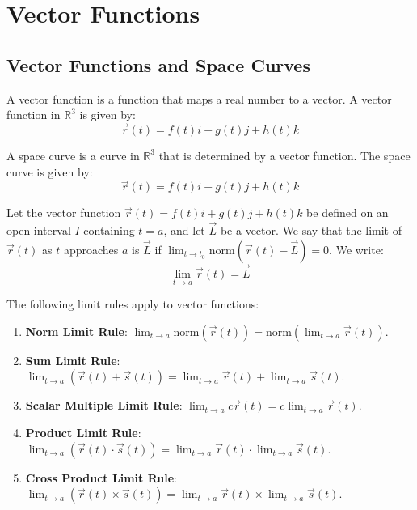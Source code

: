 \documentclass[11pt]{article}
\begin{document}
\section{Vector Functions}
\subsection{Vector Functions and Space Curves}
\begin{definition}
    A vector function is a function that maps a real number to a vector. A vector function in $\mathbb{R}^3$ is given by:
    \begin{equation}
        \vec{r}(t) = f(t)i + g(t)j + h(t)k
    \end{equation}
\end{definition}
\begin{definition}
    A space curve is a curve in $\mathbb{R}^3$ that is determined by a vector function. The space curve is given by:
    \begin{equation}
        \vec{r}(t) = f(t)i + g(t)j + h(t)k
    \end{equation}
\end{definition}
\begin{definition}[Limit]
    Let the vector function $\vec{r}(t) = f(t)i + g(t)j + h(t)k$ be defined on an open interval $I$ containing $t = a$, and let $\vec{L}$ be a vector. We say that the limit of $\vec{r}(t)$ as $t$ approaches $a$ is $\vec{L}$ if $\lim_{t \to t_0} \text{norm} (\vec{r}(t) - \vec{L}) = 0$. We write:
    \begin{equation}
        \lim_{t \to a} \vec{r}(t) = \vec{L}
    \end{equation}
\end{definition}
\begin{theorem} The following limit rules apply to vector functions:
    \begin{enumerate}
        \item \textbf{Norm Limit Rule}: $\lim_{t \to a} \text{norm} (\vec{r}(t)) = \text{norm} (\lim_{t \to a} \vec{r}(t))$.
        \item \textbf{Sum Limit Rule}: $\lim_{t \to a} (\vec{r}(t) + \vec{s}(t)) = \lim_{t \to a} \vec{r}(t) + \lim_{t \to a} \vec{s}(t)$.
        \item \textbf{Scalar Multiple Limit Rule}: $\lim_{t \to a} c\vec{r}(t) = c\lim_{t \to a} \vec{r}(t)$.
        \item \textbf{Product Limit Rule}: $\lim_{t \to a} (\vec{r}(t) \cdot \vec{s}(t)) = \lim_{t \to a} \vec{r}(t) \cdot \lim_{t \to a} \vec{s}(t)$.
        \item \textbf{Cross Product Limit Rule}: $\lim_{t \to a} (\vec{r}(t) \times \vec{s}(t)) = \lim_{t \to a} \vec{r}(t) \times \lim_{t \to a} \vec{s}(t)$.
    \end{enumerate} 
\end{theorem}
\end{document}
